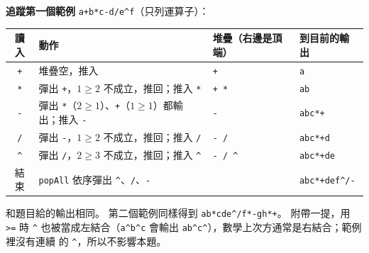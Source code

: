 \begin{pastsoln}
\textbf{追蹤第一個範例} \texttt{a+b*c-d/e\^{}f}（只列運算子）：
\begin{center}
\small
\begin{tabular}{clll}
\toprule
讀入 & 動作 & 堆疊（右邊是頂端） & 到目前的輸出 \\
\midrule
\texttt{+} & 堆疊空，推入 & \texttt{+} & \texttt{a} \\
\texttt{*} & 彈出 \texttt{+}，$1 \ge 2$ 不成立，推回；推入 \texttt{*} & \texttt{+ *} & \texttt{ab} \\
\texttt{-} & 彈出 \texttt{*}（$2 \ge 1$）、\texttt{+}（$1 \ge 1$）都輸出；推入 \texttt{-} & \texttt{-} & \texttt{abc*+} \\
\texttt{/} & 彈出 \texttt{-}，$1 \ge 2$ 不成立，推回；推入 \texttt{/} & \texttt{- /} & \texttt{abc*+d} \\
\verb|^| & 彈出 \texttt{/}，$2 \ge 3$ 不成立，推回；推入 \verb|^| & \verb|- / ^| & \texttt{abc*+de} \\
結束 & \texttt{popAll} 依序彈出 \verb|^|、\texttt{/}、\texttt{-} & & \texttt{abc*+def\^{}/-} \\
\bottomrule
\end{tabular}
\end{center}
和題目給的輸出相同。 第二個範例同樣得到 \texttt{ab*cde\^{}/f*-gh*+}。 附帶一提，用 \texttt{>=} 時
\verb|^| 也被當成左結合（\verb|a^b^c| 會輸出 \verb|ab^c^|），數學上次方通常是右結合；範例裡沒有連續
的 \verb|^|，所以不影響本題。
\end{pastsoln}
